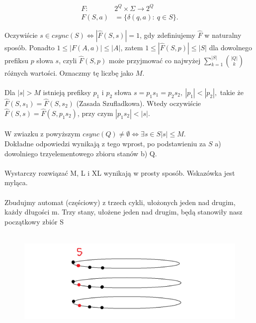 \documentclass[a4paper,11pt]{article}
\newenvironment{zadanie}[1]
  {\renewcommand\theinnercustomthm{#1}\innercustomthm}
  {\endinnercustomthm}
\begin{document}
\begin{align*}
 F :\ &2^Q \times \Sigma \longrightarrow 2^Q \\
 F(S,a) &= \{ \delta(q,a) : \ q \in S \}.
\end{align*}

Oczywiście $s \in csync(S) \Longleftrightarrow |\widehat{F}(S,s)| = 1$, gdy zdefiniujemy $\widehat{F}$ w naturalny sposób. 
Ponadto $1 \leqslant |F(A,a)| \leqslant |A|$, zatem $1 \leqslant |\widehat{F}(S,p)| \leqslant |S|$ dla dowolnego prefiksu $p$ słowa $s$,
czyli $\widehat{F}(S,p)$ może przyjmować co najwyżej $\displaystyle{\sum\limits^{|S|}_{k=1}\binom{|Q|}{k}}$ różnych wartości.
Oznaczmy tę liczbę jako $M$. \\ \\

Dla $|s| > M$ istnieją prefiksy $p_1$ i $p_2$ słowa $s = p_1s_1 = p_2s_2, \ |p_1| < |p_2|,$ takie że 
$\widehat{F}(S,s_1) = \widehat{F}(S,s_2)$ (Zasada Szufladkowa). Wtedy oczywiście $\widehat{F}(S,s) = \widehat{F}(S,p_1s_2)$, przy czym 
$|p_1s_2| < |s|$. \\ \\
W zwiazku z powyższym $csync(Q) \neq \emptyset \Longleftrightarrow \exists s \in S |s| \leqslant M$. \\
Dokładne odpowiedzi wynikają z tego wprost, po podstawieniu za $S$ a) dowolniego trzyelementowego zbioru stanów b) Q. \\ \\

\begin{zadanie}{42}
\end{zadanie}
Wystarczy rozwiązać M, L i XL wynikają w prosty sposób. Wskazówka jest myląca. \\ \\

Zbudujmy automat (częściowy) z trzech cykli, ułożonych jeden nad drugim, każdy długości m. Trzy stany, ułożene jeden nad
drugim, będą stanowiły nasz początkowy zbiór S \\ \\

\begin{figure}[h!]
  \centerline{%
    \includegraphics[width=18cm]{zad42.png}%
  }%
\end{figure}
\end{document}
